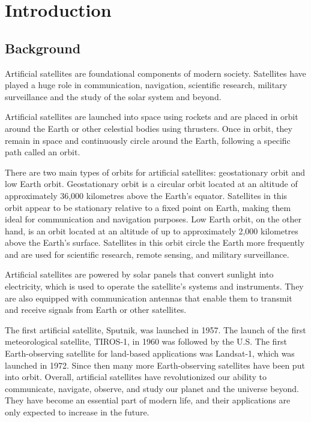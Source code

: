 \chapter{Introduction}

\justifying
\section{Background}

     Artificial satellites are foundational components of modern society. Satellites have played a huge role in communication, navigation, scientific research, military surveillance and the study of the solar system and beyond. 
     
     Artificial satellites are launched into space using rockets and are placed in orbit around the Earth or other celestial bodies using thrusters. Once in orbit, they remain in space and continuously circle around the Earth, following a specific path called an orbit.
     
     There are two main types of orbits for artificial satellites: geostationary orbit and low Earth orbit. Geostationary orbit is a circular orbit located at an altitude of approximately 36,000 kilometres above the Earth's equator. Satellites in this orbit appear to be stationary relative to a fixed point on Earth, making them ideal for communication and navigation purposes. Low Earth orbit, on the other hand, is an orbit located at an altitude of up to approximately 2,000 kilometres above the Earth's surface. Satellites in this orbit circle the Earth more frequently and are used for scientific research, remote sensing, and military surveillance.
     
     Artificial satellites are powered by solar panels that convert sunlight into electricity, which is used to operate the satellite's systems and instruments. They are also equipped with communication antennas that enable them to transmit and receive signals from Earth or other satellites.
     
     The first artificial satellite, Sputnik, was launched in 1957. The launch of the first
meteorological satellite, TIROS-1, in 1960 was followed by the U.S. The first Earth-observing satellite for land-based applications was Landsat-1, which was launched in 1972. Since then many more Earth-observing satellites have been put into orbit.  Overall, artificial satellites have revolutionized our ability to communicate, navigate, observe, and study our planet and the universe beyond. They have become an essential part of modern life, and their applications are only expected to increase in the future.
\\

